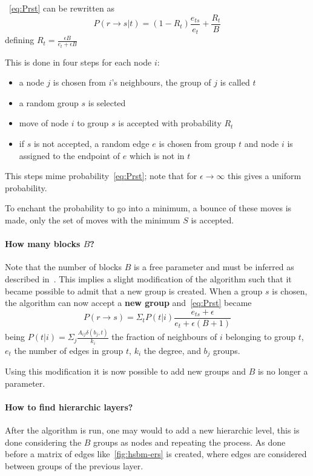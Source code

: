 ~\ref{eq:Prst} can be rewritten as \[P(r\to s|t)=(1-R_t)\frac{e_{ts}}{e_t}+\frac{R_t}{B}\]
defining $R_t=\frac{\epsilon B}{e_t + \epsilon B}$

This is done in four steps for each node $i$:
\begin{itemize}
  \item a node $j$ is chosen from $i$'s neighbours, the group of $j$ is called
  $t$
  \item a random group $s$ is selected
  \item move of node $i$ to group $s$ is accepted with probability $R_t$
  \item if $s$ is not accepted, a random edge $e$ is chosen from group $t$ and node $i$ is assigned to the endpoint of $e$ which is not in $t$
\end{itemize}
This steps mime probability~\ref{eq:Prst}; note that for $\epsilon\to\infty$ this gives a uniform probability.

To enchant the probability to go into a minimum, a bounce of these moves is made, only the set of moves with the minimum $S$ is accepted.
\paragraph{How many blocks $B$?}
Note that the number of blocks $B$ is a free parameter and must be inferred as described in~\cite{peixoto2017nonparametric}.
This implies a slight modification of the algorithm such that
it became possible to admit that a new group is created.
When a group $s$ is chosen, the algorithm can now accept a \textbf{new group} and~\ref{eq:Prst} became
\begin{equation}\label{eq:PrstB1}
  P(r\to s)=\Sigma_t P(t|i)\frac{e_{ts}+\epsilon}{e_t+\epsilon (B+1)}
\end{equation}
being $P(t|i)=\Sigma_j\frac{A_{ij}\delta(b_j, t)}{k_i}$ the fraction of neighbours of $i$ belonging to group $t$, $e_t$ the number of edges in group $t$,
$k_i$ the degree, and $b_j$ groups.

Using this modification it is now possible to add new groups and $B$ is no longer a parameter.

\paragraph{How to find hierarchic layers?}
After the algorithm is run, one may would to add a new hierarchic level, this is done considering the $B$ groups as nodes and repeating the process.
As done before a matrix of edges like~\ref{fig:hsbm-ers} is created, where edges
are considered between groups of the previous layer.

